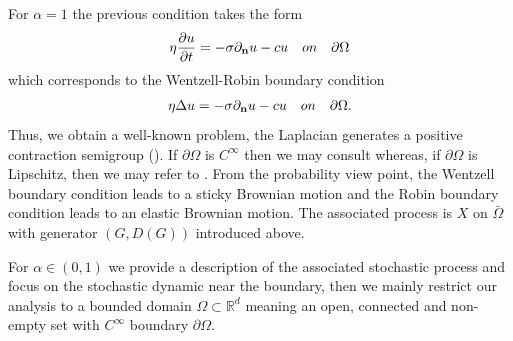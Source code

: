 \documentclass[11pt,a4paper]{article}
\begin{document}
For $\alpha=1$ the previous condition takes the form
\begin{align*}
\eta \frac{\partial u}{\partial t} = - \sigma \partial_{\bf n} u - c u \quad \textrm{on} \quad \partial \Omega 
\end{align*}
which corresponds to the Wentzell-Robin boundary condition
\begin{align*}
\eta \Delta u = - \sigma \partial_{\bf n}u - cu \quad \textrm{on} \quad \partial \Omega.
\end{align*}
Thus, we obtain a well-known problem, the Laplacian generates a positive contraction semigroup (\cite{AMPR03}). If $\partial \Omega$ is $C^\infty$ then  we may consult \cite{LionMagenes72} whereas, if $\partial \Omega$ is Lipschitz, then we may refer to \cite{JerisonKenig1981}. From the probability view point, the Wentzell boundary condition leads to a sticky Brownian motion and the Robin boundary condition leads to an elastic Brownian motion. The associated process is $X$ on $\bar{\Omega}$ with generator $(G,D(G))$ introduced above. 

For $\alpha\in (0,1)$ we provide a description of the associated stochastic process and focus on the stochastic dynamic near the boundary, then we mainly restrict our analysis to a bounded domain $\Omega \subset \mathbb{R}^d$ meaning an open, connected and non-empty set with $C^\infty$ boundary $\partial \Omega$.
\end{document}

